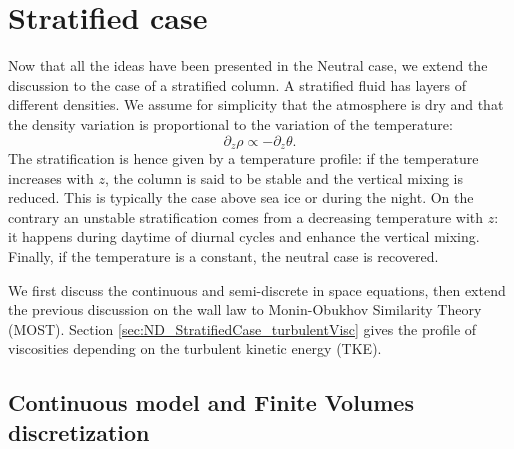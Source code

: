\section{Stratified case}
Now that all the ideas have been presented in the Neutral case,
we extend the discussion to the case of a stratified column.
A stratified fluid has layers of different densities.
We assume for simplicity that the atmosphere
is dry and that the density variation is
proportional to the variation of the temperature:
\begin{equation}
	\partial_z \rho \propto
	- \partial_z \theta.
\end{equation}
The stratification is hence given by a temperature profile:
if the temperature increases with $z$, the column is said
to be stable and the vertical mixing is reduced. This is
typically the case above sea ice or during the night.
On the contrary an unstable stratification comes from
a decreasing temperature with $z$: it happens
during daytime of diurnal cycles and enhance the
vertical mixing.
%
Finally, if the temperature is a constant, the neutral case is
recovered.
\par
We first discuss the continuous and semi-discrete in space
equations, then extend the previous discussion on the wall law to
Monin-Obukhov Similarity Theory (MOST).
Section \ref{sec:ND_StratifiedCase_turbulentVisc} gives the
profile of viscosities depending on the turbulent kinetic energy
(TKE).
\subsection{Continuous model and Finite Volumes discretization}
